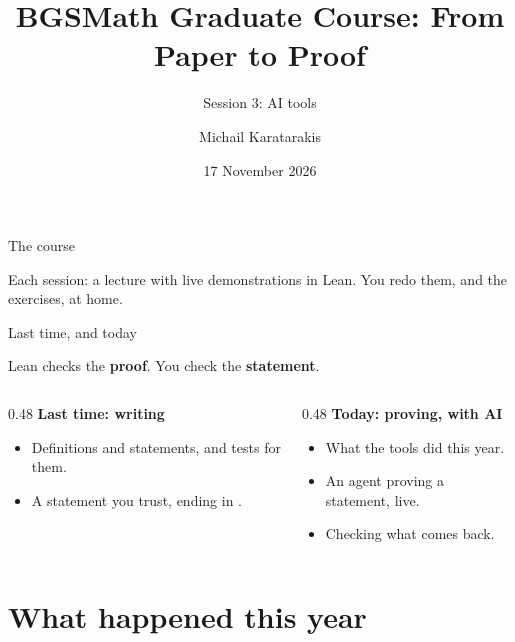 \documentclass[10pt, aspectratio=169]{beamer}
\title{BGSMath Graduate Course: From Paper to Proof}
\subtitle{Session 3: AI tools}
\author{Michail Karatarakis}
\institute{Radboud University Nijmegen \& Axiomatic AI}
\date{17 November 2026}
\begin{document}
\maketitle

\begin{frame}[fragile]{The course}

\vspace{0.4em}
Each session: a lecture with live demonstrations in Lean. You redo them, and the exercises, at home.
\end{frame}

\begin{frame}[fragile]{Last time, and today}
\begin{keypoint}
Lean checks the \textbf{proof}. You check the \textbf{statement}.
\end{keypoint}

\vspace{0.8em}
\begin{columns}[T]
\begin{column}{0.48\textwidth}
\textbf{\color{leanblue}Last time: writing}
\begin{itemize}
\item Definitions and statements, and tests for them.
\item A statement you trust, ending in .
\end{itemize}
\end{column}
\begin{column}{0.48\textwidth}
\textbf{\color{leanblue}Today: proving, with AI}
\begin{itemize}
\item What the tools did this year.
\item An agent proving a statement, live.
\item Checking what comes back.
\end{itemize}
\end{column}
\end{columns}
\end{frame}

\section{What happened this year}
\end{document}
